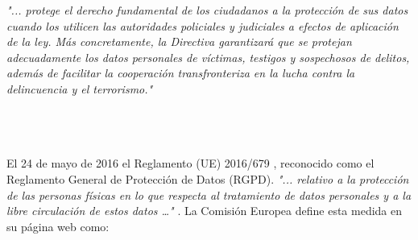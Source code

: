 \begin{refsection}
\begin{minipage}[t]{0.2\linewidth}
\end{minipage}
\hfill
\begin{minipage}[t]{0.9\linewidth}
  \textit{"... protege el derecho fundamental de los ciudadanos a la protección de sus datos cuando los utilicen las autoridades policiales y judiciales a efectos de aplicación de la ley. Más concretamente, la Directiva garantizará que se protejan adecuadamente los datos personales de víctimas, testigos y sospechosos de delitos, además de facilitar la cooperación transfronteriza en la lucha contra la delincuencia y el terrorismo."}
\end{minipage}
\\ \\ \\
El 24 de mayo de 2016 el Reglamento (UE) 2016/679 \autocite{REGLAMENTOUE2016}, reconocido como el Reglamento General de Protección de Datos (RGPD). \textit{"... relativo a la protección de las personas físicas en lo que respecta al tratamiento de datos personales y a la libre circulación de estos datos …"} \autocite[]{REGLAMENTOUE2016}. La Comisión Europea define esta medida en su página web como:


\end{refsection}
